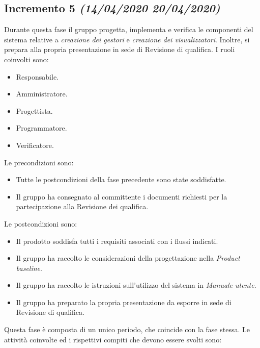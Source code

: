 \documentclass[../piano-di-progetto.tex]{subfiles}
\begin{document}
\subsection[Incremento 5]{Incremento 5 {\normalsize\normalfont\itshape(14/04/2020  20/04/2020)}}%
\label{sub:incremento_5}
Durante questa fase il gruppo progetta, implementa e verifica le componenti del sistema relative a \textit{creazione dei gestori} e \textit{creazione dei visualizzatori}. Inoltre, si prepara alla propria presentazione in sede di Revisione di qualifica.
I ruoli coinvolti sono:
\begin{itemize}
  \item Responsabile.
  \item Amministratore.
  \item Progettista.
  \item Programmatore.
  \item Verificatore.
\end{itemize}
Le precondizioni sono:
\begin{itemize}
  \item Tutte le postcondizioni della fase precedente sono state soddisfatte.
  \item Il gruppo ha consegnato al committente i documenti richiesti per la partecipazione alla Revisione dei qualifica.
\end{itemize}
Le postcondizioni sono:
\begin{itemize}
  \item Il prodotto soddisfa tutti i requisiti associati con i flussi indicati.
  \item Il gruppo ha raccolto le considerazioni della progettazione nella \textit{Product baseline}.
  \item Il gruppo ha raccolto le istruzioni sull'utilizzo del sistema in \textit{Manuale utente}.
  \item Il gruppo ha preparato la propria presentazione da esporre in sede di Revisione di qualifica.
\end{itemize}
Questa fase è composta di un unico periodo, che coincide con la fase stessa.
Le attività coinvolte ed i rispettivi compiti che devono essere svolti sono:
\end{document}
